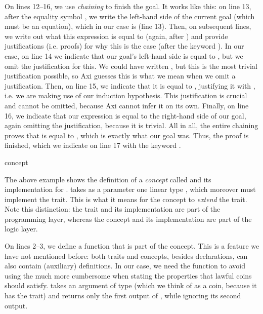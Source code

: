 On lines 12--16, we use \textit{chaining} to finish the goal. It works like this: on line 13, after the equality symbol \code{===}, we write the left-hand side of the current goal (which must be an equation), which in our case is  (line 13). Then, on subsequent lines, we write out what this expression is equal to (again, after \code{===}) and provide justifications (i.e. proofs) for why this is the case (after the keyword ). In our case, on line 14 we indicate that our goal's left-hand side is equal to , but we omit the justification for this. We could have written , but this is the most trivial justification possible, so Axi guesses this is what we mean when we omit a justification. Then, on line 15, we indicate that it is equal to , justifying it with , i.e. we are making use of our induction hypothesis. This justification is crucial and cannot be omitted, because Axi cannot infer it on its own. Finally, on line 16, we indicate that our expression is equal to the right-hand side of our goal, again omitting the justification, because it is trivial. All in all, the entire chaining proves that  is equal to , which is exactly what our goal was. Thus, the proof is finished, which we indicate on line 17 with the keyword .

\begin{example}{ concept}



\end{example}

The above example shows the definition of a \textit{concept} called  and its implementation for .  takes as a parameter one linear type , which moreover must implement the  trait. This is what it means for the  concept to \textit{extend} the  trait. Note this distinction: the trait and its implementation are part of the programming layer, whereas the concept and its implementation are part of the logic layer.

On lines 2--3, we define a function  that is part of the  concept. This is a feature we have not mentioned before: both traits and concepts, besides declarations, can also contain (auxiliary) definitions. In our case, we need the function  to avoid using the much more cumbersome  when stating the properties that lawful coins should satisfy.  takes an argument of type  (which we think of as a coin, because it has the  trait) and returns only the first output of , while ignoring its second output.

